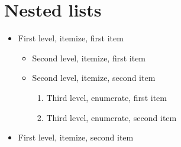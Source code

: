 \section{Nested lists}
\begin{itemize}
    \item First level, itemize, first item
    \begin{itemize}
        \item Second level, itemize, first item
        \item Second level, itemize, second item
        \begin{enumerate}
            \item Third level, enumerate, first item
            \item Third level, enumerate, second item
        \end{enumerate}
    \end{itemize}
    \item First level, itemize, second item
\end{itemize}
